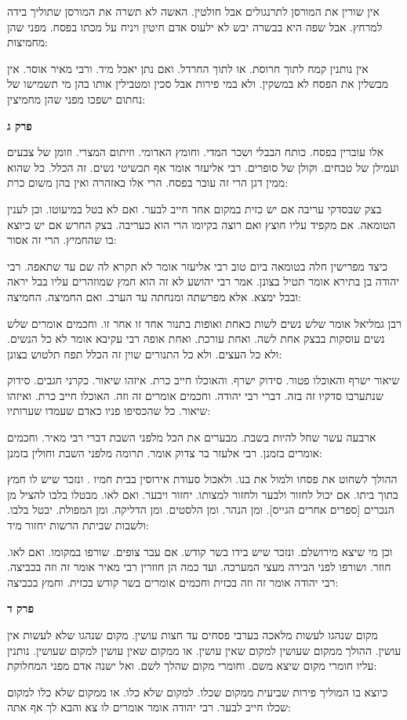 \documentclass[12pt, openany]{book}
\newcommand{\sethebfont}{
\fontsize{10.5pt}{21.0pt} \selectfont
}
\newcommand{\textblock}[1]{
{\sethebfont #1\\}	
}
\newcommand{\sectname}{}
\newcommand{\newsection}[1]{
	\addcontentsline{toc}{section}{#1}
	\renewcommand{\sectname}{#1}	
	\vspace{-\baselineskip}
	\begin{center}
		\textbf{%
\fontsize{16pt}{16pt}\selectfont
			#1}
	\end{center}
	\vspace{-\baselineskip}
	\nopagebreak
}
\begin{document}
\textblock{אין שורין את המורסן לתרנגולים אבל חולטין. האשה לא תשרה את המורסן שתוליך בידה למרחץ. אבל שפה היא בבשרה יבש לא ילעוס אדם חיטין ויניח על מכתו בפסח. מפני שהן מחמיצות:  }
\textblock{אין נותנין קמח לתוך חרוסת. או לתוך החרדל. ואם נתן יאכל מיד. ורבי מאיר אוסר. אין מבשלין את הפסח לא במשקין. ולא במי פירות אבל סכין ומטבילין אותו בהן מי תשמישו של נחתום ישפכו מפני שהן מחמיצין:  }
\newsection{פרק ג}
\textblock{אלו עוברין בפסח. כותח הבבלי ושכר המדי. וחומץ האדומי. וזיתום המצרי. וזומן של צבעים ועמילן של טבחים. וקולן של סופרים. רבי אליעזר אומר אף תכשיטי נשים. זה הכלל. כל שהוא ממין דגן הרי זה עובר בפסח. הרי אלו באזהרה ואין בהן משום כרת:  }
\textblock{בצק שבסדקי עריבה אם יש כזית במקום אחד חייב לבער. ואם לא בטל במיעוטו. וכן לענין הטומאה. אם מקפיד עליו חוצץ ואם רוצה בקיומו הרי הוא כעריבה. בצק החרש אם יש כיוצא בו שהחמיץ. הרי זה אסור:  }
\textblock{כיצד מפרישין חלה בטומאה ביום טוב רבי אליעזר אומר לא תקרא לה שם עד שתאפה. רבי יהודה בן בתירא אומר תטיל בצונן. אמר רבי יהושע לא זה הוא חמץ שמוזהרים עליו בבל יראה ובבל ימצא. אלא מפרשתה ומנחתה עד הערב. ואם החמיצה. החמיצה:  }
\textblock{רבן גמליאל אומר שלש נשים לשות כאחת ואופות בתנור אחד זו אחר זו. וחכמים אומרים שלש נשים עוסקות בבצק אחת לשה. ואחת עורכת. ואחת אופה רבי עקיבא אומר לא כל הנשים. ולא כל העצים. ולא כל התנורים שוין זה הכלל תפח תלטוש בצונן:  }
\textblock{שיאור ישרף והאוכלו פטור. סידוק ישרף. והאוכלו חייב כרת. איזהו שיאור. כקרני חגבים. סידוק שנתערבו סדקיו זה בזה. דברי רבי יהודה. וחכמים אומרים זה וזה. האוכלו חייב כרת. ואיזהו שיאור. כל שהכסיפו פניו כאדם שעמדו שערותיו:  }
\textblock{ארבעה עשר שחל להיות בשבת. מבערים את הכל מלפני השבת דברי רבי מאיר. וחכמים אומרים בזמנן. רבי אלעזר בר צדוק אומר. תרומה מלפני השבת וחולין בזמנן:  }
\textblock{ההולך לשחוט את פסחו ולמול את בנו. ולאכול סעודת אירוסין בבית חמיו . ונזכר שיש לו חמץ בתוך ביתו. אם יכול לחזור ולבער ולחזור למצותו. יחזור ויבער. ואם לאו. מבטלו בלבו להציל מן הנכרים [ספרים אחרים הגייס]. ומן הנהר. ומן הלסטים. ומן הדליקה. ומן המפולת. יבטל בלבו. ולשבות שביתת הרשות יחזור מיד:  }
\textblock{וכן מי שיצא מירושלם. ונזכר שיש בידו בשר קודש. אם עבר צופים. שורפו במקומו. ואם לאו. חוזר. ושורפו לפני הבירה מעצי המערכה. ועד כמה הן חוזרין רבי מאיר אומר זה וזה בכביצה. רבי יהודה אומר זה וזה בכזית וחכמים אומרים בשר קודש בכזית. וחמץ בכביצה:  }
\newsection{פרק ד}
\textblock{מקום שנהגו לעשות מלאכה בערבי פסחים עד חצות עושין. מקום שנהגו שלא לעשות אין עושין. ההולך ממקום שעושין למקום שאין עושין. או ממקום שאין עושין למקום שעושין. נותנין עליו חומרי מקום שיצא משם. וחומרי מקום שהלך לשם. ואל ישנה אדם מפני המחלוקת:  }
\textblock{כיוצא בו המוליך פירות שביעית ממקום שכלו. למקום שלא כלו. או ממקום שלא כלו למקום שכלו חייב לבער. רבי יהודה אומר אומרים לו צא והבא לך אף אתה:  }
\end{document}
